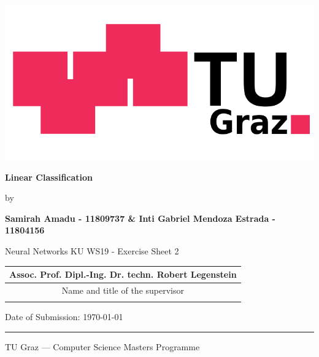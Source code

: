 \documentclass[a4paper,11pt,oneside]{article}
\newcommand{\myname}{Samirah Amadu - 11809737 \& Inti Gabriel Mendoza Estrada - 11804156}
\newcommand{\mytitle}{Linear Classification}
\newcommand{\mysupervisor}{Assoc. Prof. Dipl.-Ing. Dr. techn. Robert Legenstein}
\begin{document}

  \thispagestyle{empty}

  \begin{flushright}
    \includegraphics[scale=0.25]{TU_Graz.png}
  \end{flushright}
  \vspace{20mm}
  \begin{center}
    \huge
    \textbf{\mytitle}
  \end{center}
  \vspace*{4mm}
  \begin{center}
   \Large by
  \end{center}
  \vspace*{4mm}
  \begin{center}
    \Large
    \textbf{\myname}
  \end{center}
  \vspace*{20mm}
  \begin{center}
    \large
    Neural Networks KU WS19 - Exercise Sheet 2
  \end{center}
  \vfill
  \begin{flushright}
    \large
    \begin{tabular}{c}
      \mysupervisor \\
      \hline
      Name and title of the supervisor \\
      \\
    \end{tabular}
  \end{flushright}
  \vspace*{8mm}
  \begin{flushleft}
    \large
    Date of Submission: \today \\
    \rule{\textwidth}{1pt}
  \end{flushleft}
  \begin{center}
    \Large TU Graz --- Computer Science Masters Programme
  \end{center}
\end{document}
